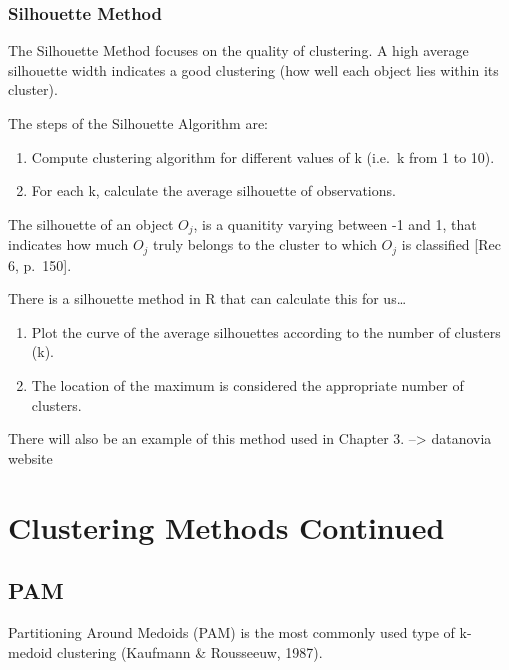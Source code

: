 \documentclass[12pt,twoside]{amherstthesis}
\providecommand{\tightlist}{%
  \setlength{\itemsep}{0pt}\setlength{\parskip}{0pt}}
\begin{document}
  \subsection{Silhouette Method}\label{silhouette-method}
  
  The Silhouette Method focuses on the quality of clustering. A high
  average silhouette width indicates a good clustering (how well each
  object lies within its cluster).
  
  The steps of the Silhouette Algorithm are:
  
  \begin{enumerate}
  \def\labelenumi{\arabic{enumi}.}
  \tightlist
  \item
    Compute clustering algorithm for different values of k (i.e.~k from 1
    to 10).
  \item
    For each k, calculate the average silhouette of observations.
  \end{enumerate}
  
  The silhouette of an object \(O_j\), is a quanitity varying between -1
  and 1, that indicates how much \(O_j\) truly belongs to the cluster to
  which \(O_j\) is classified {[}Rec 6, p.~150{]}.
  
  There is a silhouette method in R that can calculate this for us\ldots{}
  
  \begin{enumerate}
  \def\labelenumi{\arabic{enumi}.}
  \setcounter{enumi}{2}
  \tightlist
  \item
    Plot the curve of the average silhouettes according to the number of
    clusters (k).
  \item
    The location of the maximum is considered the appropriate number of
    clusters.
  \end{enumerate}
  
  There will also be an example of this method used in Chapter 3.
  --\textgreater{} datanovia website
  
  \chapter{Clustering Methods Continued}\label{typeset-equ}
  
  \section{PAM}\label{pam}
  
  Partitioning Around Medoids (PAM) is the most commonly used type of
  k-medoid clustering (Kaufmann \& Rousseeuw, 1987).
  
\end{document}
